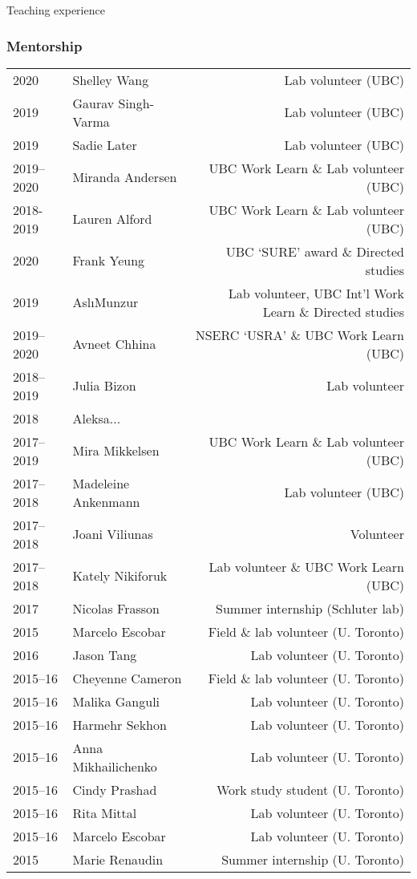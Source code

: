 \documentclass[11pt]{article}
\let\tikzi=\i %
\begin{document}
\vspace{0.5em}



\noindent \newpage
\begin{rSection}{Teaching experience} %

\noindent
\subsubsection*{Mentorship}

\begin{tabular}{llr}
2020 & Shelley Wang & Lab volunteer (UBC)\\
2019 & Gaurav Singh-Varma & Lab volunteer (UBC)\\
2019 & Sadie Later & Lab volunteer (UBC)\\ 
2019--2020 & Miranda Andersen & UBC Work Learn \& Lab volunteer (UBC)\\
2018-2019 & Lauren Alford & UBC Work Learn \& Lab volunteer (UBC)\\
2020 & Frank Yeung &  UBC `SURE' award \& Directed studies\\
2019 & Asl\tikzi \space Munzur & Lab volunteer, UBC Int'l Work Learn \& Directed studies\\
2019--2020 & Avneet Chhina & NSERC `USRA' \& UBC Work Learn (UBC) \\
2018--2019 & Julia Bizon & Lab volunteer \\
2018 & Aleksa...\\
2017--2019 & Mira Mikkelsen & UBC Work Learn \& Lab volunteer (UBC)\\
2017--2018 & Madeleine Ankenmann & Lab volunteer (UBC)\\
2017--2018 & Joani Viliunas & Volunteer \\
2017--2018 & Kately Nikiforuk & Lab volunteer \& UBC Work Learn (UBC)\\ 
2017 & Nicolas Frasson & Summer internship (Schluter lab)\\
2015 & Marcelo Escobar & Field \& lab volunteer (U. Toronto)\\
2016 & Jason Tang & Lab volunteer (U. Toronto)\\
2015--16 & Cheyenne Cameron & Field \& lab volunteer (U. Toronto)\\
2015--16 & Malika Ganguli & Lab volunteer (U. Toronto)\\
2015--16 & Harmehr Sekhon & Lab volunteer (U. Toronto)\\
2015--16 & Anna Mikhailichenko & Lab volunteer (U. Toronto)\\
2015--16 & Cindy Prashad & Work study student (U. Toronto)\\
2015--16 & Rita Mittal & Lab volunteer (U. Toronto)\\
2015--16 & Marcelo Escobar & Lab volunteer (U. Toronto)\\
2015 & Marie Renaudin & Summer internship (U. Toronto)\\


\end{tabular}
\end{rSection}
\end{document}

